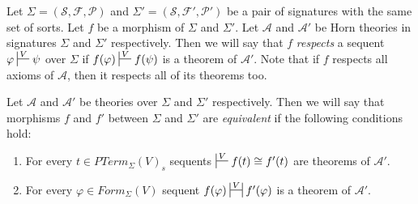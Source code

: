 \documentclass[reqno]{amsart}
\theoremstyle{definition}
\theoremstyle{remark}
\numberwithin{figure}{section}
\begin{document}
Let $\Sigma = (\mathcal{S}, \mathcal{F}, \mathcal{P})$ and $\Sigma' = (\mathcal{S}, \mathcal{F}', \mathcal{P}')$ be a pair of signatures with the same set of sorts.
Let $f$ be a morphism of $\Sigma$ and $\Sigma'$.
Let $\mathcal{A}$ and $\mathcal{A}'$ be Horn theories in signatures $\Sigma$ and $\Sigma'$ respectively.
Then we will say that $f$ \emph{respects} a sequent $\varphi \sststile{}{V} \psi$ over $\Sigma$ if $f(\varphi) \sststile{}{V} f(\psi)$ is a theorem of $\mathcal{A}'$.
Note that if $f$ respects all axioms of $\mathcal{A}$, then it respects all of its theorems too.

Let $\mathcal{A}$ and $\mathcal{A}'$ be theories over $\Sigma$ and $\Sigma'$ respectively.
Then we will say that morphisms $f$ and $f'$ between $\Sigma$ and $\Sigma'$ are \emph{equivalent} if the following conditions hold:
\begin{enumerate}
\item For every $t \in PTerm_\Sigma(V)_s$ sequents $\sststile{}{V} f(t) \cong f'(t)$ are theorems of $\mathcal{A}'$.
\label{mor-eq-a}
\item For every $\varphi \in Form_\Sigma(V)$ sequent $f(\varphi) \ssststile{}{V} f'(\varphi)$ is a theorem of $\mathcal{A}'$.
\label{mor-eq-b}
\end{enumerate}
\end{document}
